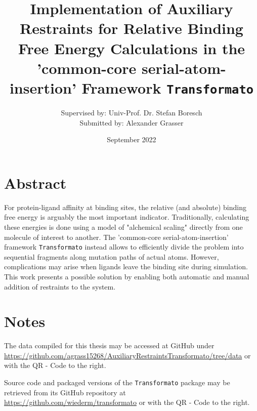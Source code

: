 \documentclass[oneside]{scrreprt}
\title{Implementation of Auxiliary Restraints for Relative Binding Free Energy Calculations in the 'common-core serial-atom-insertion' Framework \texttt{Transformato}}
\author{Supervised by: Univ-Prof. Dr. Stefan Boresch\\Submitted by: \hspace{26mm}Alexander Grasser}
\date{September 2022}
\begin{document}
\begin{titlepage}

\maketitle{}
\end{titlepage}
\section*{Abstract}
    
    For protein-ligand affinity at binding sites, the relative (and absolute) binding free energy is arguably the most important indicator. Traditionally, calculating these energies is done using a model of "alchemical scaling" directly from one molecule of interest to another. The 'common-core serial-atom-insertion' framework \texttt{Transformato} instead allows to efficiently divide the problem into sequential fragments along mutation paths of actual atoms. However, complications may arise when ligands leave the binding site during simulation. This work presents a possible solution by enabling both automatic and manual addition of restraints to the system.
\vspace{\fill}
\section*{Notes}
\noindent\begin{minipage}{0.7\textwidth}
The data compiled for this thesis may be accessed at GitHub under \url{https://github.com/agrass15268/AuxiliaryRestraintsTransformato/tree/data} or with the QR - Code to the right.
\end{minipage}
\hspace{0.1\textwidth}
\begin{minipage}{0.2\textwidth}

\end{minipage}
 
\vspace{1cm}

\noindent\begin{minipage}{0.7\textwidth}
Source code and packaged versions of the \texttt{Transformato} package may be retrieved from its GitHub repository at  \url{https://github.com/wiederm/transformato} or with the QR - Code to the right.
\end{minipage}
\hspace{0.1\textwidth}
\begin{minipage}{0.2\textwidth}

\end{minipage}
\newpage
\end{document}
